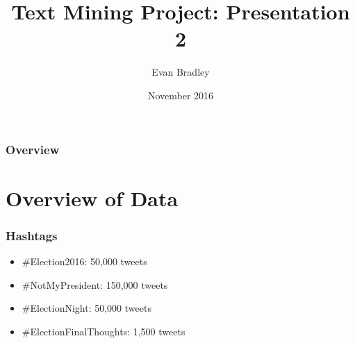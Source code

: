 \documentclass{beamer}
\title[Text Mining Project]{Text Mining Project: Presentation 2} %
\author{Evan Bradley} %
\institute[OU] %
{
Oakland University \\ %
\medskip
\textit{edbradley@oakland.edu} %
}
\date{November 2016} %
\begin{document}
\begin{frame}
	\frametitle{\space}
	\titlepage %
\end{frame}

\begin{frame}
\frametitle{Overview} %
\tableofcontents %
\end{frame}


\section{Overview of Data} %




\begin{frame}
	\frametitle{Hashtags}
	\begin{itemize}
		\item \#Election2016: 50,000 tweets
		\newline
		\item \#NotMyPresident: 150,000 tweets
		\newline
		\item \#ElectionNight: 50,000 tweets
		\newline
		\item \#ElectionFinalThoughts: 1,500 tweets
		\newline
	\end{itemize}
\end{frame}
\end{document}
